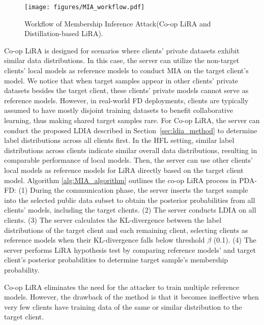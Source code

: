 \begin{figure}
    \centering
    \texttt{[image: figures/MIA\_workflow.pdf]}
    \caption{Workflow of Membership Inference Attack(Co-op LiRA and Distillation-based LiRA).}
    \label{fig:MIA_workflow}
\end{figure}

 Co-op LiRA is designed for scenarios where clients' private datasets exhibit similar data distributions.
In this case, the server can utilize the non-target clients' local models as reference models to conduct MIA on the target client's model.
We notice that when target samples appear in other clients' private datasets besides the target client, these clients' private models cannot serve as reference models. 
However, in real-world FD deployments, clients are typically assumed to have mostly disjoint training datasets to benefit collaborative learning, thus making shared target samples rare.
For Co-op LiRA, the server can conduct the proposed LDIA described in Section~\ref{sec:ldia_method} to determine label distributions across all clients first. 
In the HFL setting, similar label distributions across clients indicate similar overall data distributions, resulting in comparable performance of local models. 
Then, the server can use other clients' local models as reference models for LiRA directly based on the target client model.
Algorithm \ref{alg:MIA_algorithm} outlines the co-op LiRA process in PDA-FD:
(1) During the communication phase, the server inserts the target sample into the selected public data subset to obtain the posterior probabilities from all clients' models, including the target clients.
(2) The server conducts LDIA on all clients.
(3) The server calculates the KL-divergence between the label distributions of the target client and each remaining client, selecting clients as reference models when their KL-divergence falls below threshold $\beta$ (0.1).
(4) The server performs LiRA hypothesis test by comparing reference models' and target client's posterior probabilities to determine target sample's membership probability.

Co-op LiRA eliminates the need for the attacker to train multiple reference models. 
However, the drawback of the method is that it becomes ineffective when very few clients have training data of the same or similar distribution to the target client.

